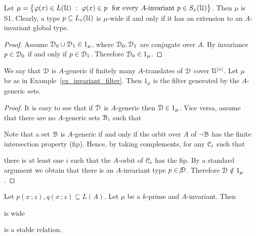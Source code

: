 \documentclass{amsproc}
\begin{document}
\begin{example}\label{ex_invariant_filter}
  Let $\mu=\big\{\varphi(x)\in L(\EuScript U)\ :\ \varphi(x)\in p\ {\rm\ for\ every\ } A\textrm{-invariant}\ p\in S_x(\EuScript U) \big\}$.
  Then $\mu$ is S1.
  Clearly, a type $p\subseteq L_x(\EuScript U)$ is $\mu$-wide if and only if it has an extension to an $A$-invariant global type.
\end{example}

\begin{proof}
  Assume $\EuScript D_0\cup\EuScript D_1\in1_\mu$, where $\EuScript D_0,\EuScript D_1$ are conjugate over $A$.
  By invariance $p\in\EuScript D_0$ if and only if $p\in\EuScript D_1$. Therefore $\EuScript D_0\in1_\mu$.
\end{proof}

\begin{example}
  We say that $\EuScript D$ is $A$-generic if finitely many $A$-translates of $\EuScript D$ cover $\EuScript U^{|x|}$.
  Let $\mu$ be as in Example~\ref{ex_invariant_filter}.
  Then $1_\mu$ is the filter generated by the $A$-generic sets.
\end{example}
  
\begin{proof}
  It is easy to see that if $\EuScript D$ is $A$-generic then $\EuScript D\in1_\mu$.
  Vice versa, assume that there are no $A$-generic sets $\EuScript B_i$ such that 


  Note that a set $\EuScript B$ is $A$-generic if and only if the orbit over $A$ of $\neg\EuScript B$ has the finite intersection property (fip).
  Hence, by taking complements, for any $\EuScript C_i$ such that 
  

  there is at least one $i$ such that the $A$-orbit of $\EuScript C_i$ has the fip.
  By a standard argument we obtain that there is an $A$-invariant type $p\in\not\EuScript D$.
  Therefore $\EuScript D\notin1_\mu$.
\end{proof}

\begin{theorem}
  Let $p(x\,;z), q(x\,;z)\subseteq L(A)$.
  Let $\mu$ be a $k$-prime and $A$-invariant.
  Then 

   is wide

  is a stable relation.
\end{theorem}
\end{document}
